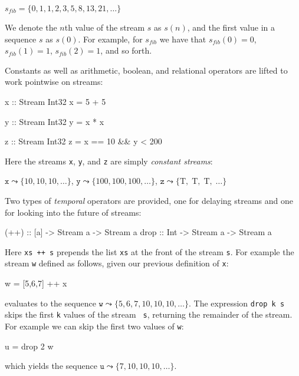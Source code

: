 \documentclass[]{article}
\theoremstyle{example}
\begin{document}
\begin{center}
$s_{fib} = \{0, 1, 1, 2, 3, 5, 8, 13, 21, \dots \}$
\end{center}

\noindent We denote the $n$th value of the stream $s$ as $s(n)$, and the first
value in a sequence $s$ as $s(0)$. For example, for $s_{fib}$ we have that $s_{fib}(0) = 0$,
$s_{fib}(1) = 1$, $s_{fib}(2) = 1$, and so forth.

Constants as well as arithmetic, boolean, and relational operators are
lifted to work pointwise on streams:

\noindent
\begin{code}
x :: Stream Int32
x = 5 + 5

y :: Stream Int32
y = x * x

z :: Stream Int32
z = x == 10 && y < 200
\end{code}


\noindent Here the streams {\tt x}, {\tt y}, and {\tt z} are simply
\emph{constant streams}:

\begin{center}
$\mathtt{x} \leadsto \{10, 10, 10, \dots \}$,
$\mathtt{y} \leadsto \{100, 100, 100,  \dots \}$,
$\mathtt{z} \leadsto \{\mbox{T},\; \mbox{T},\; \mbox{T},\; \dots \}$
\end{center}

Two types of \emph{temporal} operators are provided, one for delaying streams and one for
looking into the future of streams:
%
\begin{code}
(++) :: [a] -> Stream a -> Stream a
drop :: Int -> Stream a -> Stream a
\end{code}
%
Here {\tt xs ++ s} prepends the list {\tt xs} at the front of the stream {\tt s}.
For example the stream {\tt w} defined as follows, given our previous definition
of {\tt x}:
%
\begin{code}
w = [5,6,7] ++ x
\end{code}
%
evaluates to the sequence
$\mathtt{w} \leadsto \{5, 6, 7, 10, 10, 10, \dots\}$.
The expression {\tt drop k s} skips the first {\tt k} values of the stream {\tt
  s}, returning the remainder of the stream.  
For example we can skip the first two values of {\tt w}:
%
\begin{code}
u = drop 2 w
\end{code}
%
which yields the sequence
$\mathtt{u} \leadsto \{7, 10, 10, 10, \dots\}$.
\end{document}
